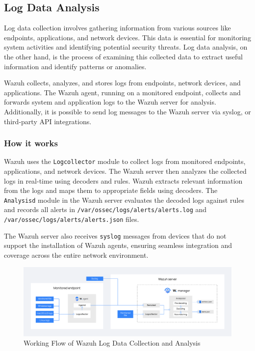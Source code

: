 \subsection{Log Data Analysis}
\label{log-data-analysis}

Log data collection involves gathering information from various sources like endpoints, applications, and network devices. This data is essential for monitoring system activities and identifying potential security threats. Log data analysis, on the other hand, is the process of examining this collected data to extract useful information and identify patterns or anomalies.

Wazuh collects, analyzes, and stores logs from endpoints, network devices, and applications. The Wazuh agent, running on a monitored endpoint, collects and forwards system and application logs to the Wazuh server for analysis. Additionally, it is possible to send log messages to the Wazuh server via syslog, or third-party API integrations.

\subsubsection{How it works}
Wazuh uses the \texttt{Logcollector} module to collect logs from monitored endpoints, applications, and network devices. The Wazuh server then analyzes the collected logs in real-time using decoders and rules. Wazuh extracts relevant information from the logs and maps them to appropriate fields using decoders. The \texttt{Analysisd} module in the Wazuh server evaluates the decoded logs against rules and records all alerts in \texttt{/var/ossec/logs/alerts/alerts.log} and \texttt{/var/ossec/logs/alerts/alerts.json} files.

The Wazuh server also receives \texttt{syslog} messages from devices that do not support the installation of Wazuh agents, ensuring seamless integration and coverage across the entire network environment.

\begin{figure} [H]
\centering
\includegraphics[width=\textwidth]{images/log-data/log-data.png}
\caption{Working Flow of Wazuh Log Data Collection and Analysis}
\label{fig:wazuhlogflow}
\end{figure}

